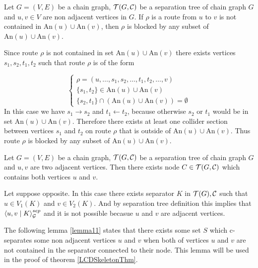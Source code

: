 \begin{lemma} \label{lemma10}
	Let $G = (V, E)$ be a chain graph, $\mathcal{T}(G, \mathcal{C})$ be a separation tree of chain graph $G$ and $u, v \in V$ are non adjacent vertices in $G$.
	If $\rho$ is a route from $u$ to $v$ is not contained in $\mbox{An}(u) \cup  \mbox{An}(v)$, then $\rho$ is blocked by any subset of
	$\mbox{An}(u) \cup  \mbox{An}(v)$.
\end{lemma}

\begin{prf}
	Since route $\rho$ is not contained in set $\mbox{An}(u) \cup  \mbox{An}(v)$ there exists vertices $s_1, s_2, t_1, t_2$ such that 
	route $\rho$ is of the form

	\begin{equation}
		\begin{cases}
			\rho = \left(u, \dots, s_1, s_2, \dots, t_1, t_2, \dots, v \right)   \\ 
			\{ s_1, t_2 \} \in \mbox{An}(u) \cup  \mbox{An}(v)  \\ 
			\{ s_2, t_1 \} \cap \left(\mbox{An}(u) \cup  \mbox{An}(v) \right) = \emptyset	
		\end{cases}
	\end{equation}
	In this case we have $s_1 \rightarrow s_2$ and $t_1 \leftarrow t_2$, because otherwise $s_2$ or $t_1$ would be in set 
	$\mbox{An}(u) \cup  \mbox{An}(v)$. Therefore there exists at least one collider section between vertices $s_1$ and $t_2$ 
	on route $\rho$ that is outside of $\mbox{An}(u) \cup  \mbox{An}(v)$. Thus route $\rho$ is blocked by 
	any subset of $\mbox{An}(u) \cup  \mbox{An}(v)$.
	\QED
\end{prf}


\begin{lemma} \label{lemma12}
	Let $G = (V, E)$ be a chain graph, $\mathcal{T}(G, \mathcal{C})$ be a separation tree of chain graph $G$
	and $u, v$ are two adjacent vertices. Then there exists node $C \in \mathcal{T}(G, \mathcal{C})$ which contains both vertices $u$ and $v$.
\end{lemma}

\begin{prf}
	Let suppose opposite. In this case there exists separator $K$ in $\mathcal{T}(G), \mathcal{C}$ such that $u \in V_1(K)$ and $v \in V_2(K)$.
	And by separation tree definition this implies that $\left\langle u , v \mid K \right\rangle_{\mathcal{G}}^{sep}$ and it is not possible becasue $u$ and $v$ are adjacent vertices.
	\QED
\end{prf}



The following lemma \ref{lemma11} states that there exists some set $S$ which c-separates some non adjacent vertices $u$ and $v$
when both of vertices $u$ and $v$ are not contained in the separator connected to their node. 
This lemma will be used in the proof of theorem \ref{LCDSkeletonThm}.


